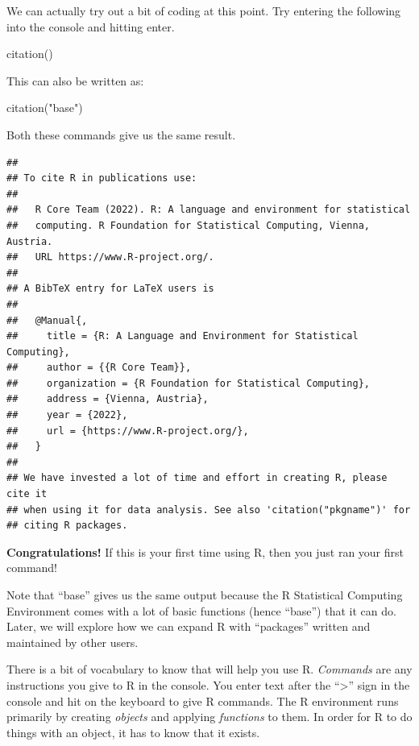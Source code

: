 \documentclass[
]{article}
\newenvironment{Shaded}{\begin{snugshade}}{\end{snugshade}}
\newcommand{\FunctionTok}[1]{\textcolor[rgb]{0.00,0.00,0.00}{#1}}
\newcommand{\NormalTok}[1]{#1}
\newcommand{\StringTok}[1]{\textcolor[rgb]{0.31,0.60,0.02}{#1}}
\begin{document}
We can actually try out a bit of coding at this point. Try entering the
following into the console and hitting enter.

\begin{Shaded}
\begin{Highlighting}[]
\FunctionTok{citation}\NormalTok{()}
\end{Highlighting}
\end{Shaded}

This can also be written as:

\begin{Shaded}
\begin{Highlighting}[]
\FunctionTok{citation}\NormalTok{(}\StringTok{"base"}\NormalTok{)}
\end{Highlighting}
\end{Shaded}

Both these commands give us the same result.

\begin{verbatim}
## 
## To cite R in publications use:
## 
##   R Core Team (2022). R: A language and environment for statistical
##   computing. R Foundation for Statistical Computing, Vienna, Austria.
##   URL https://www.R-project.org/.
## 
## A BibTeX entry for LaTeX users is
## 
##   @Manual{,
##     title = {R: A Language and Environment for Statistical Computing},
##     author = {{R Core Team}},
##     organization = {R Foundation for Statistical Computing},
##     address = {Vienna, Austria},
##     year = {2022},
##     url = {https://www.R-project.org/},
##   }
## 
## We have invested a lot of time and effort in creating R, please cite it
## when using it for data analysis. See also 'citation("pkgname")' for
## citing R packages.
\end{verbatim}

\textbf{Congratulations!} If this is your first time using R, then you
just ran your first command!

Note that ``base'' gives us the same output because the R Statistical
Computing Environment comes with a lot of basic functions (hence
``base'') that it can do. Later, we will explore how we can expand R
with ``packages'' written and maintained by other users.

There is a bit of vocabulary to know that will help you use R.
\emph{Commands} are any instructions you give to R in the console. You
enter text after the ``\textgreater{}'' sign in the console and hit on
the keyboard to give R commands. The R environment runs primarily by
creating \emph{objects} and applying \emph{functions} to them. In order
for R to do things with an object, it has to know that it exists.
\end{document}
